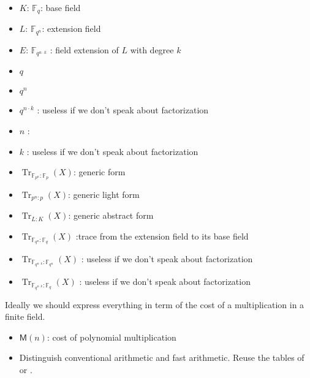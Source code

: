 \documentclass{sig-alternate}
\newcommand{\ff}[1]{\mathbb{F}_{#1}}
\newcommand{\basefsize}{q}
\newcommand{\extfdegree}{n}
\newcommand{\extfsize}{\basefsize^\extfdegree}
\newcommand{\extfactfdegree}{k}
\newcommand{\extfactfsize}{\basefsize^{\extfdegree \cdot \extfactfdegree}}
\newcommand{\basef}{\ff{\basefsize}}
\newcommand{\extf}{\ff{\extfsize}}
\newcommand{\extfactf}{\ff{\extfactfsize}}
\DeclareMathOperator{\Tr}{Tr}
\newcommand{\tr}[2]{\Tr_{\ff{#1}:\ff{#2}}}
\newcommand{\trl}[2]{\Tr_{#1:#2}}
\newcommand{\trabs}[2]{\Tr_{#1:#2}}
\newcommand{\trextbase}{\trabs{\extf}{\basef}}
\newcommand{\trextfactext}{\trabs{\extfactf}{\extf}}
\newcommand{\trextfactbase}{\trabs{\extfactf}{\basef}}
\newcommand{\Mul}{\mathsf{M}}
\begin{document}
\medskip


\begin{itemize}
\item $K$: $\basef$: base field
\item $L$:  $\extf$: extension field 
\item $E$: $\extfactf$ : field extension of $L$ with degree $k$  
\item $\basefsize$
\item $\extfsize$
\item $\extfactfsize$ : useless if we don't speak about factorization
\item $\extfdegree$ : 
\item $\extfactfdegree$ : useless if we don't speak about factorization

\end{itemize}




\medskip



\begin{itemize}
\item $\tr{p^n}{p}(X)$: generic form
\item $\trl{p^n}{p}(X)$: generic light form
\item $\trabs{L}{K}(X)$: generic abstract form
\item $\trextbase(X)$ :trace from the extension field to its base field 
\item $\trextfactext(X)$ : useless if we don't speak about factorization
\item $\trextfactbase(X)$ : useless if we don't speak about factorization

\end{itemize}



Ideally we should express everything in term of the cost of a multiplication in  a finite field.

\begin{itemize}
\item $\Mul(n)$: cost of polynomial multiplication
\item Distinguish conventional arithmetic and fast arithmetic. Reuse the tables of \cite{KaltofenS97} or \cite{Umans08}.
\end{itemize}
\end{document}
